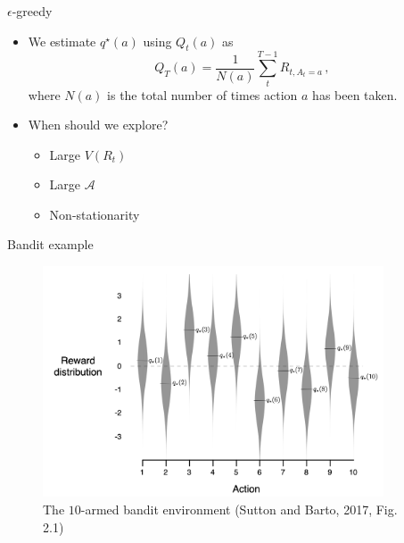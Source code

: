 \documentclass[10pt]{beamer}
\begin{document}
\begin{frame}{$\epsilon$-greedy}

\begin{itemize}
\item We estimate $q^\star(a)$ using $Q_t(a)$ as
\[
Q_T(a) = \frac{1}{N(a)} \sum^{T-1}_t R_{t,A_t=a}\,,
\]
where $N(a)$ is the total number of times action $a$ has been taken.
\pause
\item When should we explore?
\begin{itemize}
\item Large $V(R_t)$\pause
\item Large $\mathcal{A}$\pause
\item Non-stationarity
\end{itemize}
\end{itemize}

\end{frame}


\begin{frame}{Bandit example}

\begin{figure}[h]
\centering
\includegraphics[width=0.9\textwidth]{fig/sutton_fig_2_1.png}
\caption{The $10$-armed bandit environment (Sutton and Barto, 2017, Fig. 2.1)}
\end{figure}

\end{frame}
\end{document}
